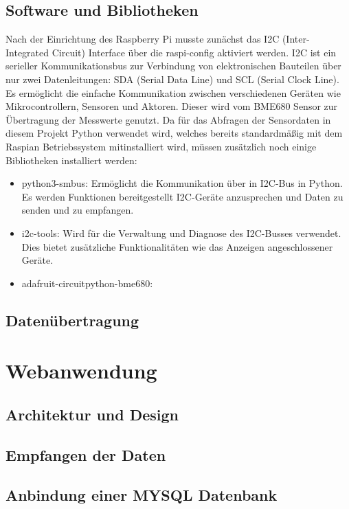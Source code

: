 \documentclass[conference]{IEEEtran}
\begin{document}
\subsection{Software und Bibliotheken}
Nach der Einrichtung des Raspberry Pi musste zunächst das I2C (Inter-Integrated Circuit) Interface über die raspi-config aktiviert werden. I2C  ist ein serieller Kommunikationsbus zur Verbindung von elektronischen Bauteilen über nur zwei Datenleitungen: SDA (Serial Data Line) und SCL (Serial Clock Line). Es ermöglicht die einfache Kommunikation zwischen verschiedenen Geräten wie Mikrocontrollern, Sensoren und Aktoren. Dieser wird vom BME680 Sensor zur Übertragung der Messwerte genutzt. Da für das Abfragen der Sensordaten in diesem Projekt Python verwendet wird, welches bereits standardmäßig mit dem Raspian Betriebssystem mitinstalliert wird, müssen zusätzlich noch einige Bibliotheken installiert werden: 
\begin{itemize}
	\item python3-smbus: Ermöglicht die Kommunikation über in I2C-Bus in Python. Es werden Funktionen bereitgestellt I2C-Geräte anzusprechen und Daten zu senden und zu empfangen.
	\item i2c-tools: Wird für die Verwaltung und Diagnose des I2C-Busses verwendet. Dies bietet zusätzliche Funktionalitäten wie das Anzeigen angeschlossener Geräte.
	\item adafruit-circuitpython-bme680: 
\end{itemize}

\subsection{Datenübertragung}


\section{Webanwendung}
\subsection{Architektur und Design}
\subsection{Empfangen der Daten}
\subsection{Anbindung einer MYSQL Datenbank}
\end{document}
